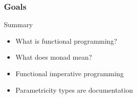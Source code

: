 \begin{frame}
\frametitle{Goals}
\begin{block}{Summary}
\begin{itemize}
\item What is functional programming?
\item What does monad mean?
\item Functional imperative programming
\item Parametricity \textemdash types are documentation
\end{itemize}
\end{block}
\end{frame}
